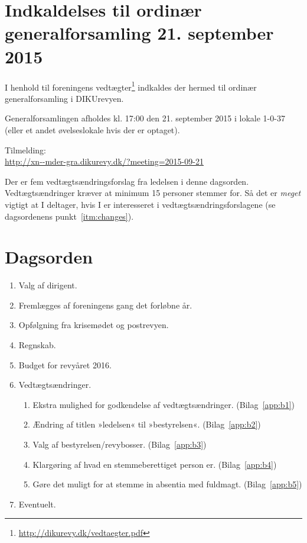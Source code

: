 \documentclass[a4paper,11pt]{report}
\begin{document}
\section*{Indkaldelses til ordinær generalforsamling 21. september 2015}

I henhold til foreningens vedtægter\footnote{\url{http://dikurevy.dk/vedtaegter.pdf}} indkaldes der hermed til
ordinær generalforsamling i DIKUrevyen.

Generalforsamlingen afholdes kl. 17:00 den 21. september 2015 i lokale
1-0-37 (eller et andet øvelseslokale hvis der er optaget).

Tilmelding:\\
\url{http://xn--mder-gra.dikurevy.dk/?meeting=2015-09-21}

Der er fem vedtægtsændringsforslag fra ledelsen i denne dagsorden. 
Vedtægtsændringer kræver at minimum 15 personer stemmer for.  Så det er
\emph{meget} vigtigt at I deltager, hvis I er interesseret i
vedtægtsændringsforslagene (se dagsordenens punkt~\ref{itm:changes}).

\section*{Dagsorden}

\begin{enumerate}
\item Valg af dirigent.
\item Fremlægges af foreningens gang det forløbne år.
\item Opfølgning fra krisemødet og postrevyen.
\item Regnskab.
\item Budget for revyåret 2016.
\item \label{itm:changes} Vedtægtsændringer.
\begin{enumerate}
\item \label{itm:changes1} Ekstra mulighed for godkendelse af vedtægtsændringer. (Bilag~\ref{app:b1})
\item \label{itm:changes2} Ændring af titlen »ledelsen« til »bestyrelsen«. (Bilag~\ref{app:b2})
\item \label{itm:changes3} Valg af bestyrelsen/revybosser. (Bilag~\ref{app:b3})
\item \label{itm:changes4} Klargøring af hvad en stemmeberettiget person er. (Bilag~\ref{app:b4})
\item \label{itm:changes5} Gøre det muligt for at stemme in absentia med fuldmagt. (Bilag~\ref{app:b5})
\end{enumerate}
\item Eventuelt.
\end{enumerate}
\end{document}
